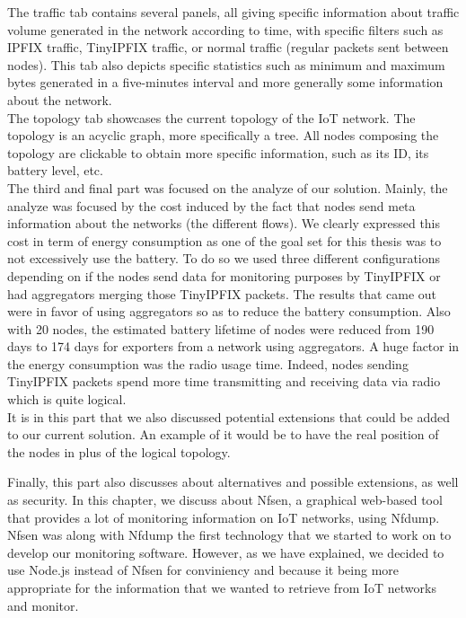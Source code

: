 The traffic tab contains several panels, all giving specific information about traffic volume generated in the network according to time, with specific filters such as IPFIX traffic, TinyIPFIX traffic, or normal traffic (regular packets sent between nodes). This tab also depicts specific statistics such as minimum and maximum bytes generated in a five-minutes interval and more generally some information about the network. \\

The topology tab showcases the current topology of the IoT network. The topology is an acyclic graph, more specifically a tree. All nodes composing the topology are clickable to obtain more specific information, such as its ID, its battery level, etc.\\

The third and final part was focused on the analyze of our solution. Mainly, the analyze was focused by the cost induced by the fact that nodes send meta information about the networks (the different flows). We clearly expressed this cost in term of energy consumption as one of the goal set for this thesis was to not excessively use the battery. To do so we used three different configurations depending on if the nodes send data for monitoring purposes by TinyIPFIX or had aggregators merging those TinyIPFIX packets. The results that came out were in favor of using aggregators so as to reduce the battery consumption. Also with 20 nodes, the estimated battery lifetime of nodes were reduced from 190 days to 174 days for exporters from a network using aggregators. A huge factor in the energy consumption was the radio usage time. Indeed, nodes sending TinyIPFIX packets spend more time transmitting and receiving data via radio which is quite logical.\\

It is in this part that we also discussed potential extensions that could be added to our current solution. An example of it would be to have the real position of the nodes in plus of the logical topology. 


Finally, this part also discusses about alternatives and possible extensions, as well as security. In this chapter, we discuss about Nfsen, a graphical web-based tool that provides a lot of monitoring information on IoT networks, using Nfdump. Nfsen was along with Nfdump the first technology that we started to work on to develop our monitoring software. However, as we have explained, we decided to use Node.js instead of Nfsen for conviniency and because it being more appropriate for the information that we wanted to retrieve from IoT networks and monitor. \\

